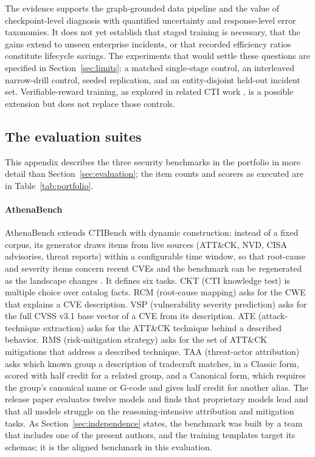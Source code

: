 \documentclass[twocolumn]{svjour3}
\begin{document}
The evidence supports the graph-grounded data pipeline and the value of checkpoint-level diagnosis with quantified uncertainty and response-level error taxonomies. It does not yet establish that staged training is necessary, that the gains extend to unseen enterprise incidents, or that recorded efficiency ratios constitute lifecycle savings. The experiments that would settle these questions are specified in Section~\ref{sec:limits}: a matched single-stage control, an interleaved narrow-drill control, seeded replication, and an entity-disjoint held-out incident set. Verifiable-reward training, as explored in related CTI work \cite{alam2026minerva}, is a possible extension but does not replace those controls.


\begin{appendix}
\section{The evaluation suites}\label{app:benchmarks}
This appendix describes the three security benchmarks in the portfolio in more detail than Section~\ref{sec:evaluation}; the item counts and scorers as executed are in Table~\ref{tab:portfolio}.

\paragraph{AthenaBench}
AthenaBench extends CTIBench \cite{alam2024ctibench} with dynamic construction: instead of a fixed corpus, its generator draws items from live sources (ATT\&CK, NVD, CISA advisories, threat reports) within a configurable time window, so that root-cause and severity items concern recent CVEs and the benchmark can be regenerated as the landscape changes \cite{alam2025athenabench}. It defines six tasks. CKT (CTI knowledge test) is multiple choice over catalog facts. RCM (root-cause mapping) asks for the CWE that explains a CVE description. VSP (vulnerability severity prediction) asks for the full CVSS v3.1 base vector of a CVE from its description. ATE (attack-technique extraction) asks for the ATT\&CK technique behind a described behavior. RMS (risk-mitigation strategy) asks for the set of ATT\&CK mitigations that address a described technique. TAA (threat-actor attribution) asks which known group a description of tradecraft matches, in a Classic form, scored with half credit for a related group, and a Canonical form, which requires the group's canonical name or G-code and gives half credit for another alias. The release paper evaluates twelve models and finds that proprietary models lead and that all models struggle on the reasoning-intensive attribution and mitigation tasks. As Section~\ref{sec:independence} states, the benchmark was built by a team that includes one of the present authors, and the training templates target its schemas; it is the aligned benchmark in this evaluation.


\end{appendix}
\end{document}
